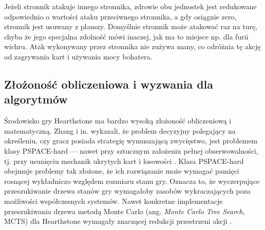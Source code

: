 Jeżeli stronnik atakuje innego stronnika, zdrowie obu jednostek jest redukowane odpowiednio o wartości ataku przeciwnego stronnika, a gdy osiągnie zero, stronnik jest usuwany z planszy. Domyślnie stronnik może atakować raz na turę, chyba że jego specjalna zdolność mówi inaczej, jak ma to miejsce np. dla furii wichru. Atak wykonywany przez stronnika nie zużywa many, co odróżnia tę akcję od zagrywania kart i używania mocy bohatera.

\subsection{Złożoność obliczeniowa i wyzwania dla algorytmów}
Środowisko gry Hearthstone ma bardzo wysoką złożoność obliczeniową i matematyczną. Zhang i in. wykazali, że problem decyzyjny polegający na określeniu, czy gracz posiada strategię wymuszającą zwycięstwo, jest problemem klasy PSPACE-hard --- nawet przy sztucznym założeniu pełnej obserwowalności, tj. przy usunięciu mechanik ukrytych kart i losowości \cite{zhang2023}. Klasa PSPACE-hard obejmuje problemy tak złożone, że ich rozwiązanie może wymagać pamięci rosnącej wykładniczo względem rozmiaru stanu gry. Oznacza to, że wyczerpujące przeszukiwanie drzewa stanów gry wymagałoby zasobów wykraczających poza możliwości współczesnych systemów. Nawet konkretne implementacje przeszukiwania drzewa metodą Monte Carlo (ang. \textit{Monte Carlo Tree Search}, MCTS) dla Hearthstone wymagały znaczącej redukcji przestrzeni akcji \cite{Santos2017,choe2019}.
